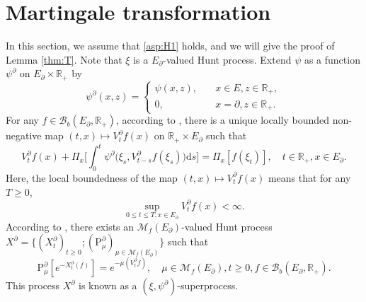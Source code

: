 \documentclass[12pt,a4paper]{amsart}
\numberwithin{equation}{section}
\theoremstyle{plain}
\theoremstyle{definition}
\theoremstyle{remark}
\begin{document}
\section{Martingale transformation} \label{sec:T}
	In this section, we assume that \eqref{asp:H1} holds, and we will give the proof of Lemma \ref{thm:T}.
	Note that $\xi$ is a $E_\partial$-valued Hunt process.
	Extend $\psi$ as a function $ \psi^\partial$ on $E_\partial \times \mathbb R_+$ by
\[
	\psi^\partial(x, z) = \begin{cases}
	\psi(x,z), &\quad x \in E, z\in \mathbb R_+,
	\\ 0, &\quad x=\partial, z\in \mathbb R_+.
	\end{cases}
\]
	For any $f \in \mathcal B_b(E_\partial,\mathbb R_+)$,  according to \cite[Proposition 2.20]{Li2011Measure-valued}, there is a unique locally bounded non-negative map $(t,x)\mapsto V^\partial_tf(x)$ on $\mathbb R_+\times E_\partial$ such that
\begin{equation}
	V_t^\partial f(x) + \Pi_x\Big[\int_0^t \psi^\partial\big(\xi_s, V^\partial_{t-s} f(\xi_s)\big) {\mathrm d}s\Big]
	= \Pi_x[f(\xi_t)],
	\quad t\in \mathbb R_+, x\in E_\partial.
\end{equation}
	Here, the local boundedness of the map $(t,x) \mapsto V_t^\partial f(x)$ means that  for any $T\geq 0$,
\[
	\sup_{0\leq t\leq T, x\in E_\partial} V^\partial_tf(x) < \infty.
\]
	According to \cite[Proposition 2.21 and Theorem 5.11]{Li2011Measure-valued}, there exists an $\mathcal M_f(E_\partial)$-valued Hunt process $X^\partial =\{(X^\partial_t)_{t\geq 0}; (\mathrm P^\partial_\mu)_{\mu \in \mathcal M_f(E_\partial)}\}$ such that
\begin{equation}\label{eq:T.005}
	\mathrm P^\partial_\mu[e^{- X^\partial_t(f)}]
	= e^{- \mu(V^\partial_tf)},
	\quad \mu\in \mathcal M_f(E_\partial), t\geq 0, f \in \mathcal B_b(E_\partial,\mathbb R_+).
\end{equation}
	This process $X^\partial$ is known as a $(\xi, \psi^\partial)$-superprocess.
\end{document}
